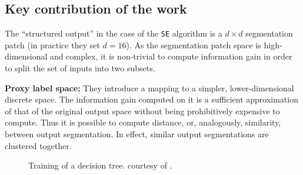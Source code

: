 \subsection{Key contribution of the work}
The ``structured output'' in the case of the {\tt SE} algorithm is a $d\times d$ segmentation patch (in practice they set $d = 16$). 
As the segmentation patch space is high-dimensional and complex, it is non-trivial to compute information gain in order to split the set of inputs into two subsets.

\textbf{Proxy label space:} They introduce a mapping to a simpler, lower-dimensional discrete space. The information gain computed on it is a sufficient approximation of that of the original output space without being prohibitively expensive to compute. Thus it is possible to compute distance, or, analogously, similarity, between output segmentation. In effect, similar output segmentations are clustered together.

\begin{figure}[t]
\centering
\caption[Training of a structured decision tree]{Training of a decision tree. \protect{} courtesy of \cite{DollarICCV13PresentationSlides}.}
\label{fig:srf-training}
\end{figure}

